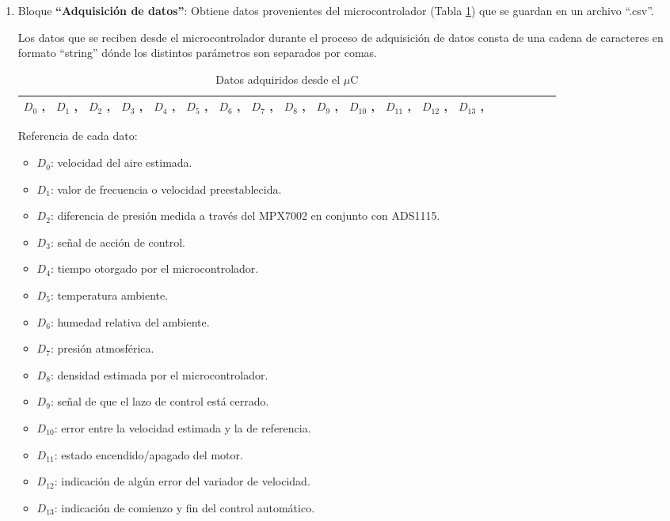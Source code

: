 \begin{enumerate}
\item Bloque \textbf{“Adquisición de datos”}: 
\subitem Obtiene datos provenientes del microcontrolador (Tabla \ref{tab:Datosdesde}) que se guardan en un archivo “.csv”. 
 
Los datos que se reciben desde el microcontrolador durante el proceso de adquisición de datos consta de una cadena de caracteres en formato “string” dónde los distintos parámetros son separados por comas.
\begin{table}[H]
	\centering
	\begin{tabular}{|l|l|l|l|l|l|l|l|l|l|l|l|l|l|l|l|l|l|l|l|}
		\hline
		$D_0$ , & $D_1$ , & $D_2$ , & $D_3$ , & $D_4$ , & $D_5$ , & $D_6$ ,  & $D_7$ , & $D_8$ , & $D_9$ , & $D_{10}$ , & $D_{11}$ , & $D_{12}$ , & $D_{13}$ ,  \\ \hline
	\end{tabular}
\caption{Datos adquiridos desde el $\mu$C}
\label{tab:Datosdesde}
\end{table}

Referencia de cada dato:
	\begin{itemize}
	\item $D_0$: velocidad del aire estimada.
	\item 	$D_1$: valor de frecuencia o velocidad preestablecida.
	\item 	$D_2$: diferencia de presión medida a través del MPX7002 en conjunto con ADS1115.
	\item 	$D_3$: señal de acción de control.
	\item 	$D_4$: tiempo otorgado por el microcontrolador.
	\item 	$D_5$: temperatura ambiente.
	\item 	$D_6$: humedad relativa del ambiente.
	\item 	$D_7$: presión atmosférica.
	\item 	$D_8$: densidad estimada por el microcontrolador.
	\item 	$D_9$: señal de que el lazo de control está cerrado.
	\item 	$D_{10}$: error entre la velocidad estimada y la de referencia.
	\item 	$D_{11}$: estado encendido/apagado del motor.
	\item 	$D_{12}$: indicación de algún error del variador de velocidad.
	\item 	$D_{13}$: indicación de comienzo y fin del control automático.
	\end{itemize}	



\end{enumerate}
